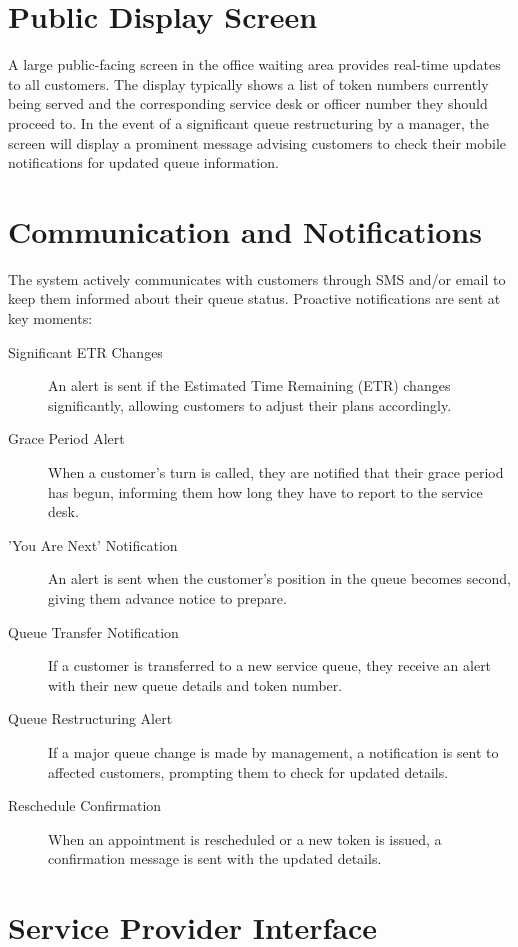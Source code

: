 \documentclass[12pt,a4paper]{report}
\begin{document}
\section{Public Display Screen}

A large public-facing screen in the office waiting area provides real-time updates to all customers. The display typically shows a list of token numbers currently being served and the corresponding service desk or officer number they should proceed to. In the event of a significant queue restructuring by a manager, the screen will display a prominent message advising customers to check their mobile notifications for updated queue information.

\section{Communication and Notifications}

The system actively communicates with customers through SMS and/or email to keep them informed about their queue status. Proactive notifications are sent at key moments:

\begin{description}
    \item[Significant ETR Changes] An alert is sent if the Estimated Time Remaining (ETR) changes significantly, allowing customers to adjust their plans accordingly.
    \item[Grace Period Alert] When a customer's turn is called, they are notified that their grace period has begun, informing them how long they have to report to the service desk.
    \item['You Are Next' Notification] An alert is sent when the customer's position in the queue becomes second, giving them advance notice to prepare.
    \item[Queue Transfer Notification] If a customer is transferred to a new service queue, they receive an alert with their new queue details and token number.
    \item[Queue Restructuring Alert] If a major queue change is made by management, a notification is sent to affected customers, prompting them to check for updated details.
    \item[Reschedule Confirmation] When an appointment is rescheduled or a new token is issued, a confirmation message is sent with the updated details.
\end{description}

\section{Service Provider Interface}
\end{document}
